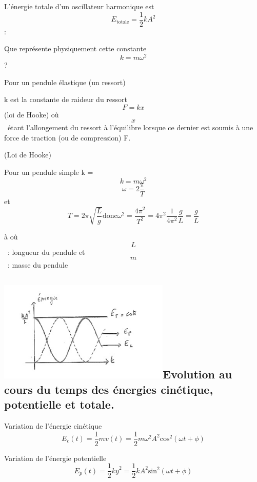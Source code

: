 L'énergie totale d'un oscillateur harmonique
est~\[{E_{\text{totale}} = \frac{1}{2}}kA^{2}\]:

Que représente physiquement cette constante \[{k = m}\omega^{2}\]?

Pour un pendule élastique (un ressort)

k est la constante de raideur du ressort \[{F = k}x\](loi de Hooke) où
\[x\]~étant l'allongement du ressort à l'équilibre lorsque ce dernier
est soumis à une force de traction (ou de compression) F.

(Loi de Hooke)

Pour un pendule simple k =\[{k = m}\omega^{2}\]
\[{\omega = 2}\frac{\pi}{T}\]et
\[{T = 2}\pi\sqrt{\frac{L}{g}}\text{donc}{\omega^{2} = \frac{4\pi^{2}}{T^{2}} = {4\pi^{2}}}\frac{1}{4\pi^{2}}{\frac{g}{L} = \frac{g}{L}}\]

à où \[L\]~: longueur du pendule et \[m\]~: masse du pendule

\hypertarget{evolution-au-cours-du-temps-des-uxe9nergies-cinuxe9tique-potentielle-et-totale.}{%
\subsection[Evolution au cours du temps des énergies cinétique,
potentielle et totale.
]{\texorpdfstring{\protect\includegraphics[width=8.183cm,height=4.821cm]{Pictures/100000010000018B000000E85C3B5046EC401703.png}\protect\hypertarget{anchor-5}{}{}Evolution
au cours du temps des énergies cinétique, potentielle et totale.
}{Evolution au cours du temps des énergies cinétique, potentielle et totale. }}\label{evolution-au-cours-du-temps-des-uxe9nergies-cinuxe9tique-potentielle-et-totale.}}

Variation de l'énergie cinétique
\[E_{c}{{(t)} = \frac{1}{2}}mv{{(t)} = \frac{1}{2}}m\omega^{2}A^{2}\text{cos}^{2}{({\omega{t + \phi}})}\]

Variation de l'énergie potentielle
\[E_{p}{{(t)} = \frac{1}{2}}{\mathit{ky}^{2} = \frac{1}{2}}kA^{2}\text{sin}^{2}{({\omega{t + \phi}})}\]

